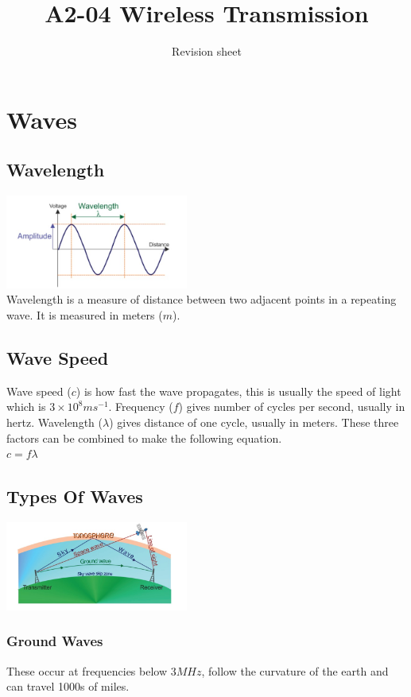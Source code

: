 \documentclass[a4paper,11pt, twocolumn]{article}
\title{A2-04 Wireless Transmission}
\author{Revision sheet}
\date{}
\begin{document}
\maketitle
\thispagestyle{fancy}

\section{Waves}
\subsection{Wavelength}
\includegraphics[width=0.45\textwidth]{wavelength.jpg}\\
Wavelength is a measure of distance between two adjacent points in a repeating wave. It is measured in meters ($m$).
\subsection{Wave Speed}
Wave speed ($c$) is how fast the wave propagates, this is usually the speed of light which is $3\times 10^8 ms^{-1}$. Frequency ($f$) gives number of cycles per second, usually in hertz. Wavelength ($\lambda$) gives distance of one cycle, usually in meters. These three factors can be combined to make the following equation.\\
$\displaystyle c =  f \lambda $
\subsection{Types Of Waves}
\includegraphics[width=0.45\textwidth]{typesOfWaves.jpg}\\
\subsubsection{Ground Waves}
These occur at frequencies below $3MHz$, follow the curvature of the earth and can travel 1000s of miles.
\end{document}
